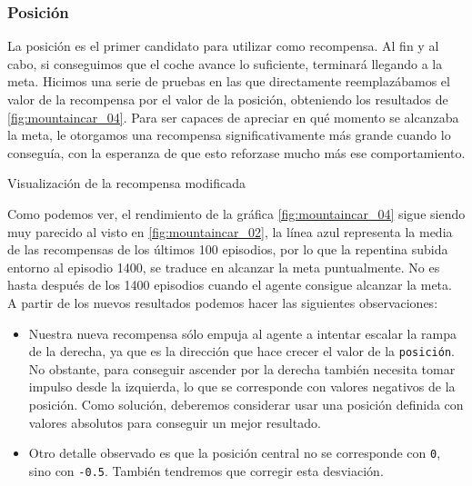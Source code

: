 \subsubsection*{Posición}

La posición es el primer candidato para utilizar como recompensa. Al fin y al cabo, si conseguimos que el coche avance lo suficiente, terminará llegando a la meta. Hicimos una serie de pruebas en las que directamente reemplazábamos el valor de la recompensa por el valor de la posición, obteniendo los resultados de \ref{fig:mountaincar_04}. Para ser capaces de apreciar en qué momento se alcanzaba la meta, le otorgamos una recompensa significativamente más grande cuando lo conseguía, con la esperanza de que esto reforzase mucho más ese comportamiento.

%
       {Visualización de la recompensa modificada}

Como podemos ver, el rendimiento de la gráfica \ref{fig:mountaincar_04} sigue siendo muy parecido al visto en  \ref{fig:mountaincar_02}, la línea azul representa la media de las recompensas de los últimos 100 episodios, por lo que la repentina subida entorno al episodio 1400, se traduce en alcanzar la meta puntualmente. No es hasta después de los 1400 episodios cuando el agente consigue alcanzar la meta. A partir de los nuevos resultados podemos hacer las siguientes observaciones:

\begin{itemize}
    \item Nuestra nueva recompensa sólo empuja al agente a intentar escalar la rampa de la derecha, ya que es la dirección que hace crecer el valor de la \texttt{posición}. No obstante, para conseguir ascender por la derecha también necesita tomar impulso desde la izquierda, lo que se corresponde con valores negativos de la posición. Como solución, deberemos considerar usar una posición definida con valores absolutos para conseguir un mejor resultado.
    \item Otro detalle observado es que la posición central no se corresponde con \texttt{0}, sino con \texttt{-0.5}. También tendremos que corregir esta desviación.
\end{itemize}

